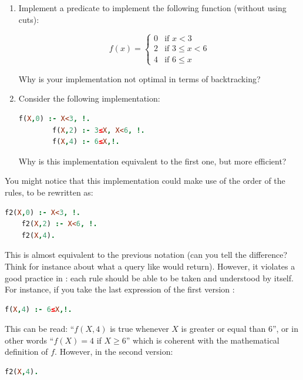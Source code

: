\documentclass{../../../tp}
\begin{document}
\begin{instruction}
	\begin{enumerate}
		\item Implement a  predicate to implement the following function (without using cuts):
		
		$$ f(x) = \begin{cases} 
		0 & \textrm{if $x < 3$}  \\ 
		2 & \textrm{if $3 \leq x < 6$} \\
		4 & \textrm{if $6 \leq x$} 
		\end{cases} $$
		
		Why is your implementation not optimal in terms of backtracking? 
		
		\item Consider the following implementation: 
		
		\begin{lstlisting}[language=prolog]
		f(X,0) :- X<3, !.
		f(X,2) :- 3≤X, X<6, !.
		f(X,4) :- 6≤X,!.
		\end{lstlisting}
		
		Why is this implementation equivalent to the first one, but more efficient? 
	\end{enumerate}
\end{instruction}

You might notice that this implementation could make use of the order of the rules, to be rewritten as:

\begin{lstlisting}[language=prolog]
	f2(X,0) :- X<3, !.
	f2(X,2) :- X<6, !.
	f2(X,4).
\end{lstlisting}

This is almost equivalent to the previous notation (can you tell the difference? Think for instance about what a query like  would return). However, it violates a good practice in \prolog: each rule should be able to be taken and understood by itself. For instance, if you take the last expression of the first version :
\begin{lstlisting}[language=prolog]
	f(X,4) :- 6≤X,!.
\end{lstlisting}

This can be read: ``$f(X,4)$ is true whenever $X$ is greater or equal than 6'', or in other words ``$f(X) = 4$ if $X \geq 6$'' which is coherent with the mathematical definition of $f$. However, in the second version: 
\begin{lstlisting}[language=prolog]
	f2(X,4).
\end{lstlisting}
\end{document}
